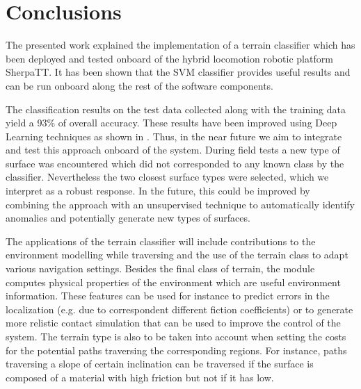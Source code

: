 \documentclass{article}
\begin{document}
\section{Conclusions}

The presented work explained the implementation of a terrain classifier which has been deployed and tested onboard of the hybrid locomotion robotic platform SherpaTT.
It has been shown that the SVM classifier provides useful results and can be run onboard along the rest of the software components.

The classification results on the test data collected along with the training data yield a 93\% of overall accuracy. 
These results have been improved using Deep Learning techniques as shown in \cite{ugenti2021}. 
Thus, in the near future we aim to integrate and test this approach onboard of the system.
During field tests a new type of surface was encountered which did not corresponded to any known class by the classifier. 
Nevertheless the two closest surface types were selected, which we interpret as a robust response.
In the future, this could be improved by combining the approach with an unsupervised technique to automatically identify anomalies and potentially generate new types of surfaces.

The applications of the terrain classifier will include contributions to the environment modelling while traversing and the use of the terrain class to adapt various navigation settings.
Besides the final class of terrain, the module computes physical properties of the environment which are useful environment information. 
These features can be used for instance to predict errors in the localization (e.g. due to correspondent different fiction coefficients) or to generate more relistic contact simulation that can be used to improve the control of the system.
The terrain type is also to be taken into account when setting the costs for the potential paths traversing the corresponding regions. 
For instance, paths traversing a slope of certain inclination can be traversed if the surface is composed of a material with high friction but not if it has low.


\FloatBarrier



\end{document}

